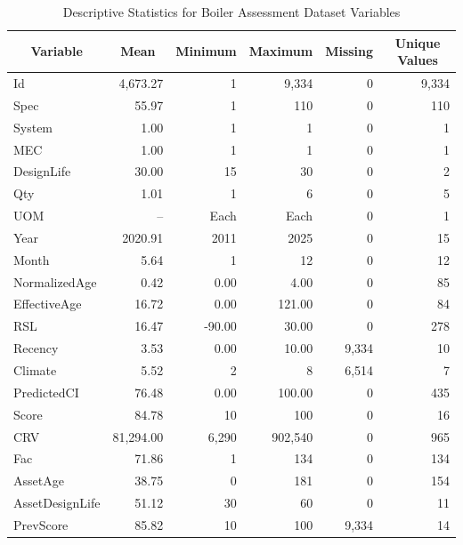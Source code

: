 \documentclass[NewProceedings,letterpaper,NoPageNumbers,NoLineNumbers, DoubleSpace]{ascelike-new}
\begin{document}
\begin{table}[htbp]
\caption{Descriptive Statistics for Boiler Assessment Dataset Variables}
\label{tab:boiler_descriptive_statistics}
\centering
\small
\renewcommand{\arraystretch}{1.15}
\begin{tabular}{l r r r r r}
\hline\hline
\multicolumn{1}{c}{Variable} &
\multicolumn{1}{c}{Mean} &
\multicolumn{1}{c}{Minimum} &
\multicolumn{1}{c}{Maximum} &
\multicolumn{1}{c}{Missing} &
\multicolumn{1}{c}{Unique Values} \\
\hline
Id                & 4,673.27 & 1     & 9,334   & 0     & 9,334 \\
Spec              & 55.97    & 1     & 110     & 0     & 110 \\
System            & 1.00     & 1     & 1       & 0     & 1 \\
MEC               & 1.00     & 1     & 1       & 0     & 1 \\
DesignLife        & 30.00    & 15    & 30      & 0     & 2 \\
Qty               & 1.01     & 1     & 6       & 0     & 5 \\
UOM               & --       & Each  & Each    & 0     & 1 \\
Year              & 2020.91  & 2011  & 2025    & 0     & 15 \\
Month             & 5.64     & 1     & 12      & 0     & 12 \\
NormalizedAge     & 0.42     & 0.00  & 4.00    & 0     & 85 \\
EffectiveAge      & 16.72    & 0.00  & 121.00  & 0     & 84 \\
RSL               & 16.47    & -90.00& 30.00   & 0     & 278 \\
Recency           & 3.53     & 0.00  & 10.00   & 9,334 & 10 \\
Climate           & 5.52     & 2     & 8       & 6,514 & 7 \\
PredictedCI       & 76.48    & 0.00  & 100.00  & 0     & 435 \\
Score             & 84.78    & 10    & 100     & 0     & 16 \\
CRV               & 81,294.00& 6,290 & 902,540 & 0     & 965 \\
Fac               & 71.86    & 1     & 134     & 0     & 134 \\
AssetAge          & 38.75    & 0     & 181     & 0     & 154 \\
AssetDesignLife   & 51.12    & 30    & 60      & 0     & 11 \\
PrevScore         & 85.82    & 10    & 100     & 9,334 & 14 \\
\hline\hline
\end{tabular}
\end{table}
\end{document}
